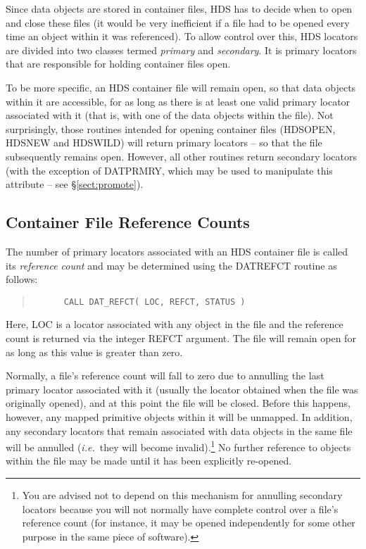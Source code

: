 \documentclass[twoside,11pt]{article}
\newcommand{\htmlref}[2]{#1}
\newcommand{\xlabel}[1]{}
\renewcommand{\_}{\texttt{\symbol{95}}}
\newcommand{\st}[1]{{\em{#1}}}
\begin{document}
Since data objects are stored in container files, HDS has to decide
when to open and close these files (it would be very inefficient if a
file had to be opened every time an object within it was
referenced). To allow control over this, HDS locators are divided into
two classes termed \st{primary} and \st{secondary}. It is primary
locators that are responsible for holding container files open.

To be more specific, an HDS container file will remain open, so that
data objects within it are accessible, for as long as there is at
least one valid primary locator associated with it (that is, with one
of the data objects within the file). Not surprisingly, those routines
intended for opening container files (\htmlref{HDS\_OPEN}{HDS_OPEN},
\htmlref{HDS\_NEW}{HDS_NEW} and \htmlref{HDS\_WILD}{HDS_WILD}) will
return primary locators -- so that the file subsequently remains
open. However, all other routines return secondary locators (with the
exception of \htmlref{DAT\_PRMRY}{DAT_PRMRY}, which may be used to
manipulate this attribute -- see \S\ref{sect:promote}).

\subsection{\xlabel{container_file_reference_counts}\label{sect:refct}Container File Reference Counts}

The number of \htmlref{primary}{sect:primary} locators associated with
an HDS container file is called its \st{reference count} and may be
determined using the \htmlref{DAT\_REFCT}{DAT_REFCT} routine as
follows:

\small
\begin{quote}
\begin{verbatim}
      CALL DAT_REFCT( LOC, REFCT, STATUS )
\end{verbatim}
\end{quote}
\normalsize

Here, LOC is a locator associated with any object in the file and the
reference count is returned via the integer REFCT argument. The file
will remain open for as long as this value is greater than zero.

Normally, a file's reference count will fall to zero due to
\htmlref{annulling}{sect:annul} the last primary locator associated
with it (usually the locator obtained when the file was originally
opened), and at this point the file will be closed. Before this
happens, however, any mapped primitive objects within it will be
unmapped. In addition, any secondary locators that remain associated
with data objects in the same file will be annulled (\st{i.e.}\ they
will become invalid).\footnote{You are advised not to depend on this
mechanism for annulling secondary locators because you will not
normally have complete control over a file's reference count (for
instance, it may be opened independently for some other purpose in the
same piece of software).} No further reference to objects within the
file may be made until it has been explicitly re-opened.
\end{document}
